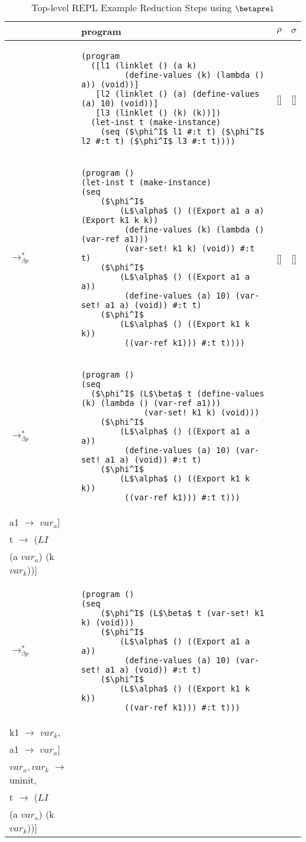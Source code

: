 \begin{table}[!htbp]
  \footnotesize
  \begin{tabular}{l >{\centering\arraybackslash}m{} c c}  %
	&\textbf{program} & \textbf{$\rho$} & \textbf{$\sigma$} \\ \hline \hline
	&\begin{lstlisting}[style=numberless]
(program
  ([l1 (linklet () (a k)
         (define-values (k) (lambda () a)) (void))]
   [l2 (linklet () (a) (define-values (a) 10) (void))]
   [l3 (linklet () (k) (k))])
  (let-inst t (make-instance)
    (seq ($\phi^I$ l1 #:t t) ($\phi^I$ l2 #:t t) ($\phi^I$ l3 #:t t))))\end{lstlisting} & [] & [] \\ \hline
	$\longrightarrow_{\beta p}^*$&\begin{lstlisting}[style=numberless]
(program ()
(let-inst t (make-instance)
(seq
	($\phi^I$
		(L$\alpha$ () ((Export a1 a a) (Export k1 k k))
		 (define-values (k) (lambda () (var-ref a1)))
		 (var-set! k1 k) (void)) #:t t)
	($\phi^I$
		(L$\alpha$ () ((Export a1 a a))
		 (define-values (a) 10) (var-set! a1 a) (void)) #:t t)
	($\phi^I$
		(L$\alpha$ () ((Export k1 k k))
		 ((var-ref k1))) #:t t))))\end{lstlisting} & [] & [] \\ \hline
	$\longrightarrow_{\beta p}^*$&\begin{lstlisting}[style=numberless]
(program ()
(seq
  ($\phi^I$ (L$\beta$ t (define-values (k) (lambda () (var-ref a1)))
             (var-set! k1 k) (void)))
	($\phi^I$
		(L$\alpha$ () ((Export a1 a a))
		 (define-values (a) 10) (var-set! a1 a) (void)) #:t t)
	($\phi^I$
		(L$\alpha$ () ((Export k1 k k))
		 ((var-ref k1))) #:t t)))\end{lstlisting} & \thead{[k1 $\rightarrow$ $var_k$, \\a1 $\rightarrow$ $var_a$]} & \thead{[$var_a,var_k$ $\rightarrow$ uninit,\\ t $\rightarrow$ ($LI$ \\ (a $var_a$) (k $var_k$))]} \\ \hline
	$\longrightarrow_{\beta p}^*$&\begin{lstlisting}[style=numberless]
(program ()
(seq
	($\phi^I$ (L$\beta$ t (var-set! k1 k) (void)))
	($\phi^I$
		(L$\alpha$ () ((Export a1 a a))
		 (define-values (a) 10) (var-set! a1 a) (void)) #:t t)
	($\phi^I$
		(L$\alpha$ () ((Export k1 k k))
		 ((var-ref k1))) #:t t)))\end{lstlisting} & \thead{[k $\rightarrow$ $cell_1$,\\k1 $\rightarrow$ $var_k$,\\a1 $\rightarrow$ $var_a$]} & \thead{[$cell_1$ $\rightarrow$ closure,\\$var_a,var_k$ $\rightarrow$ uninit,\\t $\rightarrow$ ($LI$\\(a $var_a$) (k $var_k$))]} \\ \hline
  \end{tabular}
  \caption{Top-level REPL Example Reduction Steps using $\betaprel$}
  \label{table:toplevel-example-step-by-step-formal}
\end{table}